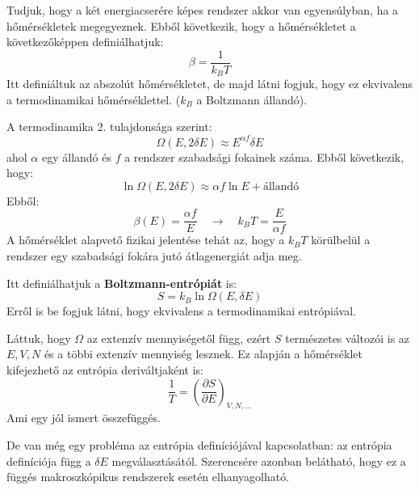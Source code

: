 \documentclass[../main.tex]{subfiles}
\begin{document}
Tudjuk, hogy a két energiacserére képes rendszer akkor van egyensúlyban, ha a hőmérsékletek megegyeznek. Ebből következik, hogy a hőmérsékletet a következőképpen definiálhatjuk:
\begin{equation}
    \beta = \frac{1}{k_B T} 
\end{equation}
Itt definiáltuk az abszolút hőmérsékletet, de majd látni fogjuk, hogy ez ekvivalens a termodinamikai hőmérséklettel. ($k_B$ a Boltzmann állandó).

A termodinamika 2. tulajdonsága szerint:
\begin{equation}
    \Omega(E, 2\delta E) \approx E^{\alpha f} \delta E
\end{equation}
ahol $\alpha$ egy állandó és $f$ a rendszer szabadsági fokainek száma. Ebből következik, hogy:
\begin{equation}
    \ln \Omega(E, 2\delta E) \approx \alpha f \ln E + \text{állandó}
\end{equation}
Ebből:
\begin{equation}
    \beta(E) = \frac{\alpha f}{E} \quad \rightarrow \quad k_B T = \frac{E}{\alpha f}
\end{equation}
A hőmérséklet alapvető fizikai jelentése tehát az, hogy a $k_B T$ körülbelül a rendszer egy szabadsági fokára jutó átlagenergiát adja meg.

Itt definiálhatjuk a \textbf{Boltzmann-entrópiát} is:
\begin{equation}
    \boxed{S = k_B \ln \Omega(E, \delta E)}
\end{equation}
Erről is be fogjuk látni, hogy ekvivalens a termodinamikai entrópiával.

Láttuk, hogy $\Omega$ az extenzív mennyiségetől függ, ezért $S$ természetes változói is az $E, V, N$ és a többi extenzív mennyiség lesznek. Ez alapján a hőmérséklet kifejezhető az entrópia deriváltjaként is:
\begin{equation}
    \frac{1}{T} = \left( \frac{\partial S}{\partial E} \right)_{V, N, \ldots}
\end{equation}
Ami egy jól ismert összefüggés. 

De van még egy probléma az entrópia definíciójával kapcsolatban: az entrópia definíciója függ a $\delta E$ megválasztásától. Szerencsére azonban belátható, hogy ez a függés makroszkópikus rendszerek esetén
elhanyagolható.
\end{document}
